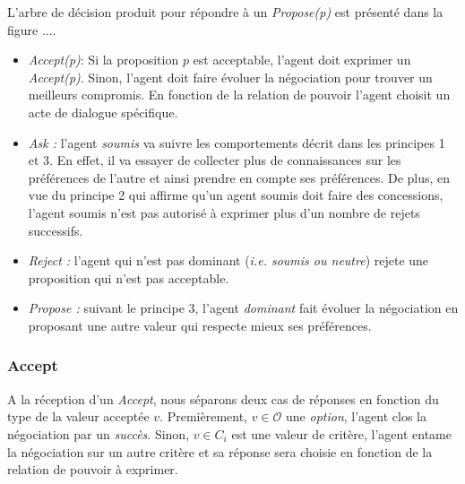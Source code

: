 			
			L'arbre de décision produit pour répondre à un \emph{Propose(p)} est présenté dans la figure .... 
			\begin{itemize}
			
				\item  \emph{Accept(p)}: Si la proposition $p$ est acceptable, l'agent doit exprimer un \emph{Accept(p)}. Sinon, l'agent doit faire évoluer la négociation pour trouver un meilleurs compromis. En fonction de la relation de pouvoir l'agent choisit un acte de dialogue spécifique.
				\item \emph{Ask :} l'agent \emph{soumis} va suivre les comportements décrit dans les principes 1 et 3. En effet, il va essayer de collecter plus de connaissances sur les préférences de l'autre et ainsi prendre en compte ses préférences. De plus, en vue du principe 2 qui affirme qu'un agent soumis doit faire des concessions, l'agent soumis n'est pas autorisé à exprimer plus d'un nombre de rejets successifs.  
				\item \emph{Reject :} l'agent qui n'est pas dominant (\emph{i.e. soumis ou neutre}) rejete une proposition qui n'est pas acceptable.
				\item \emph{Propose :} suivant le principe 3, l'agent \emph{dominant} fait évoluer la négociation en proposant une autre valeur qui respecte mieux ses préférences. 
			\end{itemize}
	
			 
	
		\subsubsection{Accept }
			A la réception	d'un \emph{Accept}, nous séparons deux cas de réponses en fonction du type de la valeur acceptée $v$.
			Premièrement, $ v \in \mathcal{O}$ une \textit{option}, l'agent clos la négociation par un \emph{succès}.
			Sinon, $v \in C_i$ est une valeur de critère, l'agent entame la négociation sur un autre critère et sa réponse sera choisie en fonction de la relation de pouvoir à exprimer.
			
